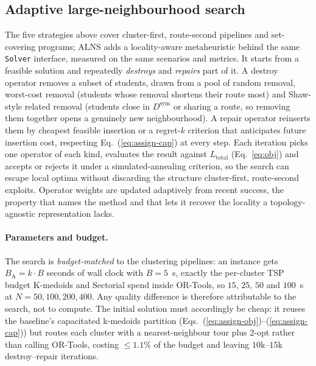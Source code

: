 \documentclass[graybox]{SNmult}
\begin{document}
\subsection{Adaptive large-neighbourhood search}\label{sec:alns}
The five strategies above cover cluster-first, route-second pipelines and
set-covering programs; ALNS adds a locality-aware metaheuristic behind the
same \texttt{Solver} interface, measured on the same scenarios and
metrics. It starts from a feasible solution and repeatedly \emph{destroys} and
\emph{repairs} part of it. A destroy operator removes a subset of
students, drawn from a pool of random removal,
worst-cost removal (students whose removal shortens their route most) and
Shaw-style related removal (students close in $D^{\mathrm{sym}}$ or
sharing a route, so removing them together opens a genuinely new
neighbourhood). A repair operator reinserts them by cheapest feasible
insertion or a regret-$k$ criterion that anticipates future insertion
cost, respecting Eq.~(\ref{eq:assign-cap}) at every step. Each iteration
picks one operator of each kind, evaluates the result against
$L_{\mathrm{total}}$ (Eq.~\ref{eq:obj}) and accepts or rejects it under a
simulated-annealing criterion, so the search can escape local optima
without discarding the structure cluster-first, route-second exploits.
Operator weights are updated adaptively from recent success, the property
that names the method and that lets it recover the locality a
topology-agnostic representation lacks.

\paragraph{Parameters and budget.}
The search is \emph{budget-matched} to the clustering pipelines: an
instance gets $B_{\mathrm{A}}=k\cdot B$ seconds of wall clock with
$B=5$~s, exactly the per-cluster TSP budget K-medoids and Sectorial spend
inside OR-Tools, so $15$, $25$, $50$ and $100$~s at $N=50,100,200,400$.
Any quality difference is therefore attributable to the search, not to
compute. The initial solution must accordingly be cheap: it reuses the
baseline's capacitated k-medoids partition
(Eqs.~(\ref{eq:assign-obj})--(\ref{eq:assign-cap})) but routes each
cluster with a nearest-neighbour tour plus 2-opt rather than calling
OR-Tools, costing $\le1.1\%$ of the budget and leaving $10$k--$15$k
destroy--repair iterations.
\end{document}
